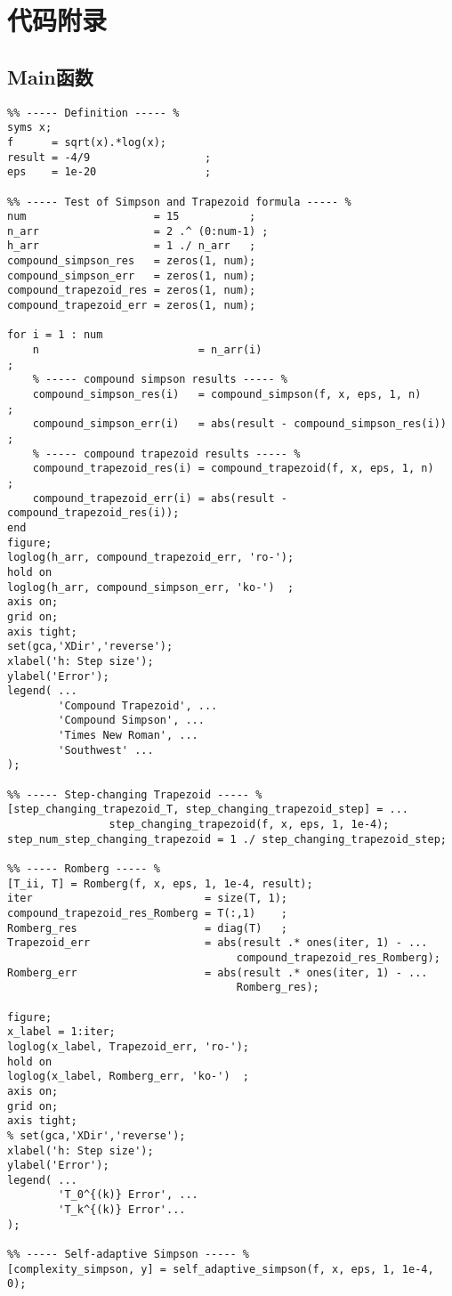 
\chapter{代码附录}

\section*{Main函数}

\lstset{language=Matlab}

\begin{lstlisting}
%% ----- Definition ----- %
syms x;
f      = sqrt(x).*log(x);
result = -4/9                  ;
eps    = 1e-20                 ;

%% ----- Test of Simpson and Trapezoid formula ----- %
num                    = 15           ;
n_arr                  = 2 .^ (0:num-1) ;
h_arr                  = 1 ./ n_arr   ;
compound_simpson_res   = zeros(1, num);
compound_simpson_err   = zeros(1, num);
compound_trapezoid_res = zeros(1, num);
compound_trapezoid_err = zeros(1, num);

for i = 1 : num
    n                         = n_arr(i)                               ;
    % ----- compound simpson results ----- %
    compound_simpson_res(i)   = compound_simpson(f, x, eps, 1, n)      ;
    compound_simpson_err(i)   = abs(result - compound_simpson_res(i))  ;
    % ----- compound trapezoid results ----- %
    compound_trapezoid_res(i) = compound_trapezoid(f, x, eps, 1, n)    ;
    compound_trapezoid_err(i) = abs(result - compound_trapezoid_res(i));
end
figure;
loglog(h_arr, compound_trapezoid_err, 'ro-');
hold on
loglog(h_arr, compound_simpson_err, 'ko-')  ;
axis on;
grid on;
axis tight;
set(gca,'XDir','reverse');
xlabel('h: Step size');
ylabel('Error');
legend( ...
        'Compound Trapezoid', ...
        'Compound Simpson', ...
        'Times New Roman', ...
        'Southwest' ...
);

%% ----- Step-changing Trapezoid ----- %
[step_changing_trapezoid_T, step_changing_trapezoid_step] = ...
                step_changing_trapezoid(f, x, eps, 1, 1e-4);
step_num_step_changing_trapezoid = 1 ./ step_changing_trapezoid_step;

%% ----- Romberg ----- %
[T_ii, T] = Romberg(f, x, eps, 1, 1e-4, result);
iter                           = size(T, 1);
compound_trapezoid_res_Romberg = T(:,1)    ;
Romberg_res                    = diag(T)   ;
Trapezoid_err                  = abs(result .* ones(iter, 1) - ...
                                    compound_trapezoid_res_Romberg);
Romberg_err                    = abs(result .* ones(iter, 1) - ...
                                    Romberg_res);

figure;
x_label = 1:iter;
loglog(x_label, Trapezoid_err, 'ro-');
hold on
loglog(x_label, Romberg_err, 'ko-')  ;
axis on;
grid on;
axis tight;
% set(gca,'XDir','reverse');
xlabel('h: Step size');
ylabel('Error');
legend( ...
        'T_0^{(k)} Error', ...
        'T_k^{(k)} Error'...
);

%% ----- Self-adaptive Simpson ----- %
[complexity_simpson, y] = self_adaptive_simpson(f, x, eps, 1, 1e-4, 0);
\end{lstlisting}   

